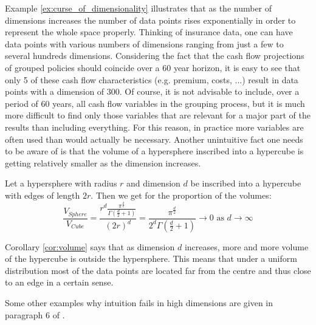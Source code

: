 Example \ref{ex:curse_of_dimensionality} illustrates that as the number of dimensions increases the number of data points rises exponentially in order to represent the whole space properly. Thinking of insurance data, one can have data points with various numbers of dimensions ranging from just a few to several hundreds dimensions. Considering the fact that the cash flow projections of grouped policies should coincide over a 60 year horizon, it is easy to see that only 5 of these cash flow characteristics (e.g. premium, costs, ...)  result in data points with a dimension of 300. Of course, it is not advisable to include, over a period of 60 years, all cash flow variables in the grouping process, but it is much more difficult to find only those variables that are relevant for a major part of the results than including everything. For this reason, in practice more variables are often used than would actually be necessary. Another unintuitive fact one needs to be aware of is that the volume of a hypersphere inscribed into a hypercube is getting relatively smaller as the dimension increases. 

\begin{theorem}\label{cor:volume}
Let a hypersphere with radius $r$ and dimension $d$ be inscribed into a hypercube with edges of length $2r$. Then we get for the proportion of the volumes:
	\begin{equation*}
		\frac{V_{Sphere}}{V_{Cube}} =\frac{r^d\frac{\pi^{\frac{d}{2}}}{\Gamma(\frac{d}{2}+1)}}{(2r)^d} =\frac{\pi^{\frac{d}{2}}}{2^d\Gamma(\frac{d}{2}+1)} \rightarrow 0 \text{ as } d \rightarrow \infty
	\end{equation*}
\end{theorem}

\begin{remark}
Corollary \ref{cor:volume}  says that as dimension $d$ increases, more and more volume of the hypercube is outside the hypersphere. This means that under a uniform distribution most of the data points are located far from the centre and thus close to an edge in a certain sense. 
\end{remark}

\begin{remark}
Some other examples why intuition fails in high dimensions are given in paragraph 6 of \cite{domingos2012few}.
\end{remark}

